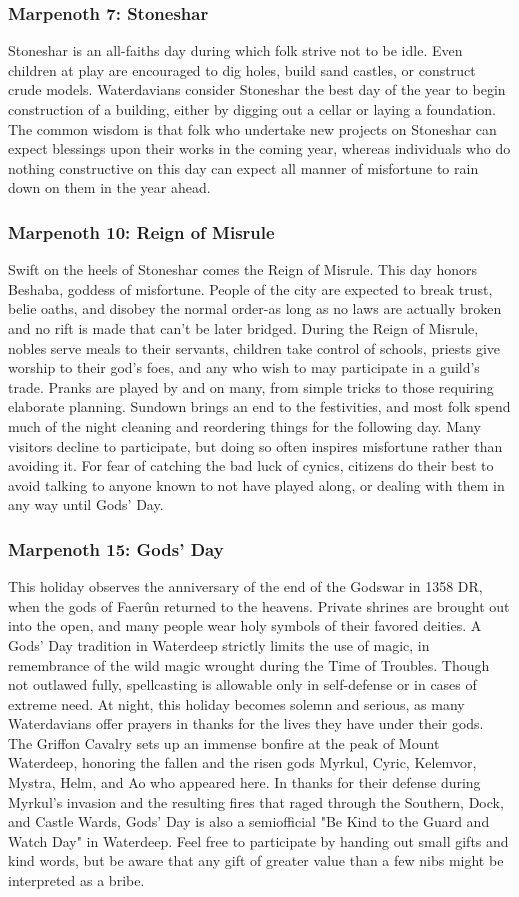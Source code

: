 \documentclass[10pt,a4paper,twoside,twocolumn,openany,nodeprecatedcode]{dndbook}
\begin{document}
\subsubsection{Marpenoth 7: Stoneshar}
Stoneshar is an all-faiths day during which folk strive not to be idle. Even children at play are encouraged to dig holes, build sand castles, or construct crude models.
Waterdavians consider Stoneshar the best day of the year to begin construction of a building, either by digging out a cellar or laying a foundation. The common wisdom is that folk who undertake new projects on Stoneshar can expect blessings upon their works in the coming year, whereas individuals who do nothing constructive on this day can expect all manner of misfortune to rain down on them in the year ahead.
\subsubsection{Marpenoth 10: Reign of Misrule}
Swift on the heels of Stoneshar comes the Reign of Misrule. This day honors Beshaba, goddess of misfortune. People of the city are expected to break trust, belie oaths, and disobey the normal order-as long as no laws are actually broken and no rift is made that can't be later bridged. During the Reign of Misrule, nobles serve meals to their servants, children take control of schools, priests give worship to their god's foes, and any who wish to may participate in a guild's trade. Pranks are played by and on many, from simple tricks to those requiring elaborate planning. Sundown brings an end to the festivities, and most folk spend much of the night cleaning and reordering things for the following day. Many visitors decline to participate, but doing so often inspires misfortune rather than avoiding it. For fear of catching the bad luck of cynics, citizens do their best to avoid talking to anyone known to not have played along, or dealing with them in any way until Gods' Day.
\subsubsection{Marpenoth 15: Gods' Day}
This holiday observes the anniversary of the end of the Godswar in 1358 DR, when the gods of Faerûn returned to the heavens. Private shrines are brought out into the open, and many people wear holy symbols of their favored deities. A Gods' Day tradition in Waterdeep strictly limits the use of magic, in remembrance of the wild magic wrought during the Time of Troubles. Though not outlawed fully, spellcasting is allowable only in self-defense or in cases of extreme need.
At night, this holiday becomes solemn and serious, as many Waterdavians offer prayers in thanks for the lives they have under their gods. The Griffon Cavalry sets up an immense bonfire at the peak of Mount Waterdeep, honoring the fallen and the risen gods Myrkul, Cyric, Kelemvor, Mystra, Helm, and Ao who appeared here. In thanks for their defense during Myrkul's invasion and the resulting fires that raged through the Southern, Dock, and Castle Wards, Gods' Day is also a semiofficial "Be Kind to the Guard and Watch Day" in Waterdeep. Feel free to participate by handing out small gifts and kind words, but be aware that any gift of greater value than a few nibs might be interpreted as a bribe.
\end{document}
